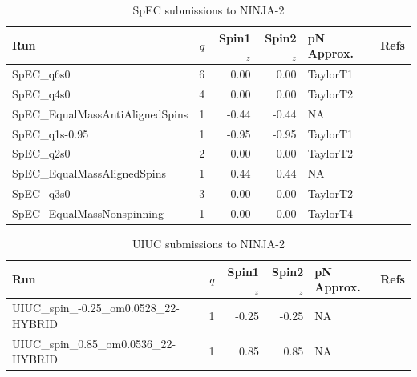 \begin{table}
\begin{center}
\begin{tabular}{|l|r|r|r|l|c|}
\hline
Run & $q$ & Spin1${}_z$ & Spin2${}_z$ & pN Approx. & Refs \\
\hline
SpEC\_q6s0 & 6 & 0.00 & 0.00 & TaylorT1 & \cite{SpECWebsite} \\
SpEC\_q4s0 & 4 & 0.00 & 0.00 & TaylorT2 & \cite{SpECWebsite} \\
SpEC\_EqualMassAntiAlignedSpins & 1 & -0.44 & -0.44 & NA & \cite{chu-2009,SpECWebsite} \\
SpEC\_q1s-0.95 & 1 & -0.95 & -0.95 & TaylorT1 & \cite{SpECWebsite} \\
SpEC\_q2s0 & 2 & 0.00 & 0.00 & TaylorT2 & \cite{SpECWebsite} \\
SpEC\_EqualMassAlignedSpins & 1 & 0.44 & 0.44 & NA & \cite{chu-2009,SpECWebsite} \\
SpEC\_q3s0 & 3 & 0.00 & 0.00 & TaylorT2 & \cite{SpECWebsite} \\
SpEC\_EqualMassNonspinning & 1 & 0.00 & 0.00 & TaylorT4 & \cite{Scheel:2008rj,SpECWebsite} \\
\hline
\end{tabular}
\end{center}
\caption[SpEC submissions to NINJA-2]{
\label{tab:ninja2_spec}
SpEC submissions to NINJA-2}
\end{table}

\begin{table}
\begin{center}
\begin{tabular}{|l|r|r|r|l|c|}
\hline
Run & $q$ & Spin1${}_z$ & Spin2${}_z$ & pN Approx. & Refs \\
\hline
UIUC\_spin\_-0.25\_om0.0528\_22-HYBRID & 1 & -0.25 & -0.25 & NA &
\cite{Husa-Hannam-etal:2007,Papadopoulos98,Campanelli:2008nk} \\
UIUC\_spin\_0.85\_om0.0536\_22-HYBRID & 1 & 0.85 & 0.85 & NA & 
\cite{Husa-Hannam-etal:2007,Papadopoulos98,Campanelli:2008nk} \\
\hline
\end{tabular}
\end{center}
\caption[UIUC submissions to NINJA-2]{
\label{tab:ninja2_uiuc}
UIUC submissions to NINJA-2}
\end{table}


